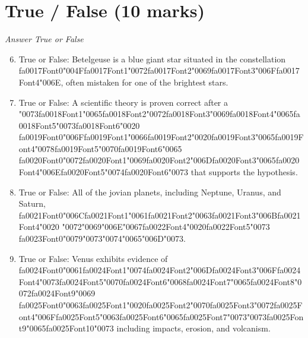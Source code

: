 \documentclass[12pt]{article}
\begin{document}
\section*{True / False (10 marks)}
\textit{Answer True or False}
\begin{enumerate}[label=\arabic*.]
\setcounter{enumi}{5}
\item True or False: Betelgeuse is a blue giant star situated in the constellation {\csname fa0017Font0\endcsname\char"004F}{\csname fa0017Font1\endcsname\char"0072}{\csname fa0017Font2\endcsname\char"0069}{\csname fa0017Font3\endcsname\char"006F}{\csname fa0017Font4\endcsname\char"006E}, often mistaken for one of the brightest stars.
\item True or False: A scientific theory is proven correct after a {\char"0073}{\csname fa0018Font1\endcsname\char"0065}{\csname fa0018Font2\endcsname\char"0072}{\csname fa0018Font3\endcsname\char"0069}{\csname fa0018Font4\endcsname\char"0065}{\csname fa0018Font5\endcsname\char"0073}{\csname fa0018Font6\endcsname\char"0020} {\csname fa0019Font0\endcsname\char"006F}{\csname fa0019Font1\endcsname\char"0066}{\csname fa0019Font2\endcsname\char"0020}{\csname fa0019Font3\endcsname\char"0065}{\csname fa0019Font4\endcsname\char"0078}{\csname fa0019Font5\endcsname\char"0070}{\csname fa0019Font6\endcsname\char"0065} {\csname fa0020Font0\endcsname\char"0072}{\csname fa0020Font1\endcsname\char"0069}{\csname fa0020Font2\endcsname\char"006D}{\csname fa0020Font3\endcsname\char"0065}{\csname fa0020Font4\endcsname\char"006E}{\csname fa0020Font5\endcsname\char"0074}{\csname fa0020Font6\endcsname\char"0073} that supports the hypothesis.
\item True or False: All of the jovian planets, including Neptune, Uranus, and Saturn, {\csname fa0021Font0\endcsname\char"006C}{\csname fa0021Font1\endcsname\char"0061}{\csname fa0021Font2\endcsname\char"0063}{\csname fa0021Font3\endcsname\char"006B}{\csname fa0021Font4\endcsname\char"0020} {\char"0072}{\char"0069}{\char"006E}{\char"0067}{\csname fa0022Font4\endcsname\char"0020}{\csname fa0022Font5\endcsname\char"0073} {\csname fa0023Font0\endcsname\char"0079}{\char"0073}{\char"0074}{\char"0065}{\char"006D}{\char"0073}.
\item True or False: Venus exhibits evidence of {\csname fa0024Font0\endcsname\char"0061}{\csname fa0024Font1\endcsname\char"0074}{\csname fa0024Font2\endcsname\char"006D}{\csname fa0024Font3\endcsname\char"006F}{\csname fa0024Font4\endcsname\char"0073}{\csname fa0024Font5\endcsname\char"0070}{\csname fa0024Font6\endcsname\char"0068}{\csname fa0024Font7\endcsname\char"0065}{\csname fa0024Font8\endcsname\char"0072}{\csname fa0024Font9\endcsname\char"0069} {\csname fa0025Font0\endcsname\char"0063}{\csname fa0025Font1\endcsname\char"0020}{\csname fa0025Font2\endcsname\char"0070}{\csname fa0025Font3\endcsname\char"0072}{\csname fa0025Font4\endcsname\char"006F}{\csname fa0025Font5\endcsname\char"0063}{\csname fa0025Font6\endcsname\char"0065}{\csname fa0025Font7\endcsname\char"0073}{\char"0073}{\csname fa0025Font9\endcsname\char"0065}{\csname fa0025Font10\endcsname\char"0073} including impacts, erosion, and volcanism.

\end{enumerate}
\end{document}
